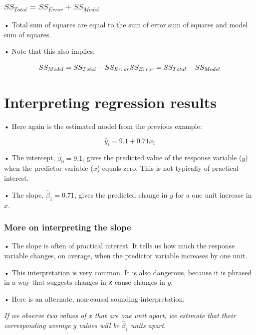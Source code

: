 \documentclass[
  letterpaper,
  DIV=11,
  numbers=noendperiod]{scrreprt}
\begin{document}
\hypertarget{ss_total-ss_error-ss_model}{%
\subsubsection{\texorpdfstring{\(SS_{Total} = SS_{Error} + SS_{Model}\)}{SS\_\{Total\} = SS\_\{Error\} + SS\_\{Model\}}}\label{ss_total-ss_error-ss_model}}

• Total sum of squares are equal to the sum of error sum of squares and
model sum of squares.

• Note that this also implies:

\[
SS_{Model} = SS_{Total} - SS_{Error} \\
SS_{Error} = SS_{Total} - SS_{Model}
\]

\hypertarget{interpreting-regression-results}{%
\section{Interpreting regression
results}\label{interpreting-regression-results}}

• Here again is the estimated model from the previous example:

\[
\hat{y}_i = 9.1 + 0.71x_i
\]

• The intercept, \(\hat{\beta}_0 = 9.1\), gives the predicted value of
the response variable (\(y\)) when the predictor variable (\(x\)) equals
zero. This is not typically of practical interest.

• The slope, \(\hat{\beta}_1 = 0.71\), gives the predicted change in
\(y\) for a one unit increase in \(x\).

\hypertarget{more-on-interpreting-the-slope}{%
\subsubsection{More on interpreting the
slope}\label{more-on-interpreting-the-slope}}

• The slope is often of practical interest. It tells us how much the
response variable changes, on average, when the predictor variable
increases by one unit.

• This interpretation is very common. It is also dangerous, because it
is phrased in a way that suggests changes in 𝑥 cause changes in \(y\).

• Here is an alternate, non-causal sounding interpretation:

\emph{If we observe two values of} \(x\) \emph{that are one unit apart,
we estimate that their corresponding average} \(y\) \emph{values will
be} \(\hat{\beta}_1\) \emph{units apart.}
\end{document}
